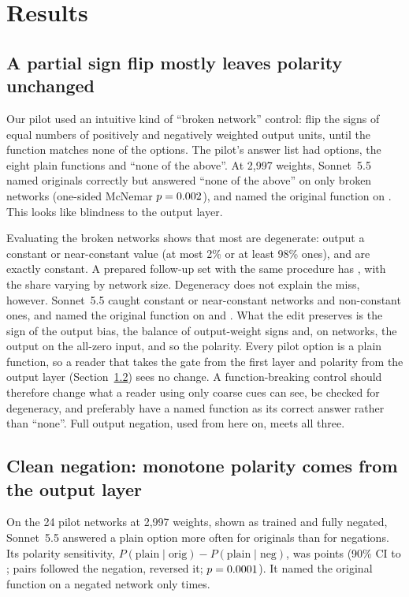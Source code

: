\documentclass[10pt]{article}
\newcommand{\Sonnet}{Sonnet~5.5}
\begin{document}
\section{Results}
\subsection{A partial sign flip mostly leaves polarity unchanged}
\label{sec:dead}
Our pilot used an intuitive kind of ``broken network'' control: flip the signs of equal numbers of positively and negatively weighted output units, until the function matches none of the options. The pilot's answer list had \nPilotOptions{} options, the eight plain functions and ``none of the above''. At 2,997 weights, \Sonnet{} named \nPilotOrig{} originals correctly but answered ``none of the above'' on only \nPilotCaught{} broken networks (one-sided McNemar $p=0.002$), and named the original function on \nPilotNamedOld{}. This looks like blindness to the output layer.

Evaluating the broken networks shows that most are degenerate: \nPilotDeadNear{} output a constant or near-constant value (at most 2\% or at least 98\% ones), and \nPilotDeadExact{} are exactly constant. A prepared follow-up set with the same procedure has \nStageDeadNear{}, with the share varying by network size. Degeneracy does not explain the miss, however. \Sonnet{} caught \nPilotDeadCaught{} constant or near-constant networks and \nPilotLiveCaught{} non-constant ones, and named the original function on \nPilotDeadNamed{} and \nPilotLiveNamed. What the edit preserves is the sign of the output bias, the balance of output-weight signs and, on \nPilotZeroSame{} networks, the output on the all-zero input, and so the polarity. Every pilot option is a plain function, so a reader that takes the gate from the first layer and polarity from the output layer (Section~\ref{sec:neg}) sees no change. A function-breaking control should therefore change what a reader using only coarse cues can see, be checked for degeneracy, and preferably have a named function as its correct answer rather than ``none''. Full output negation, used from here on, meets all three.

\subsection{Clean negation: monotone polarity comes from the output layer}
\label{sec:neg}
On the 24 pilot networks at 2,997 weights, shown as trained and fully negated, \Sonnet{} answered a plain option more often for originals than for negations. Its polarity sensitivity, $P(\text{plain}\mid\text{orig})-P(\text{plain}\mid\text{neg})$, was \nDOneS{} points (90\% CI \nDOneLo{} to \nDOneHi; \nDOneB{} pairs followed the negation, \nDOneC{} reversed it; $p=0.0001$). It named the original function on a negated network only \nDOneNamed{} times.
\end{document}
